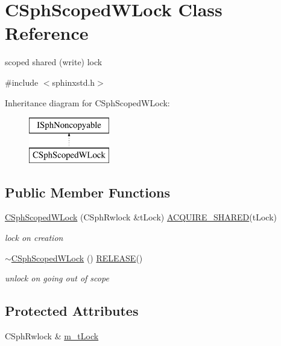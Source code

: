\hypertarget{classCSphScopedWLock}{\section{C\-Sph\-Scoped\-W\-Lock Class Reference}
\label{classCSphScopedWLock}
}


scoped shared (write) lock  




{\ttfamily \#include $<$sphinxstd.\-h$>$}

Inheritance diagram for C\-Sph\-Scoped\-W\-Lock\-:\begin{figure}[H]
\begin{center}
\leavevmode
\includegraphics[height=2.000000cm]{classCSphScopedWLock}
\end{center}
\end{figure}
\subsection*{Public Member Functions}
\begin{DoxyCompactItemize}
\item 
\hyperlink{classCSphScopedWLock_aa614ea29e208acf5370350ca4a1f9213}{C\-Sph\-Scoped\-W\-Lock} (C\-Sph\-Rwlock \&t\-Lock) \hyperlink{sphinxstd_8h_a03538b67a3c435c72dd463ab234b1913}{A\-C\-Q\-U\-I\-R\-E\-\_\-\-S\-H\-A\-R\-E\-D}(t\-Lock)
\begin{DoxyCompactList}\small\item\em lock on creation \end{DoxyCompactList}\item 
\hyperlink{classCSphScopedWLock_ad3bc18e9dc1598383dd34dd1ea3d59b6}{$\sim$\-C\-Sph\-Scoped\-W\-Lock} () \hyperlink{sphinxstd_8h_a59a3415d4063936405dfca342973c2ea}{R\-E\-L\-E\-A\-S\-E}()
\begin{DoxyCompactList}\small\item\em unlock on going out of scope \end{DoxyCompactList}\end{DoxyCompactItemize}
\subsection*{Protected Attributes}
\begin{DoxyCompactItemize}
\item 
C\-Sph\-Rwlock \& \hyperlink{classCSphScopedWLock_a9571c0a3852d1f6e49f644fab74c17b8}{m\-\_\-t\-Lock}
\end{DoxyCompactItemize}
